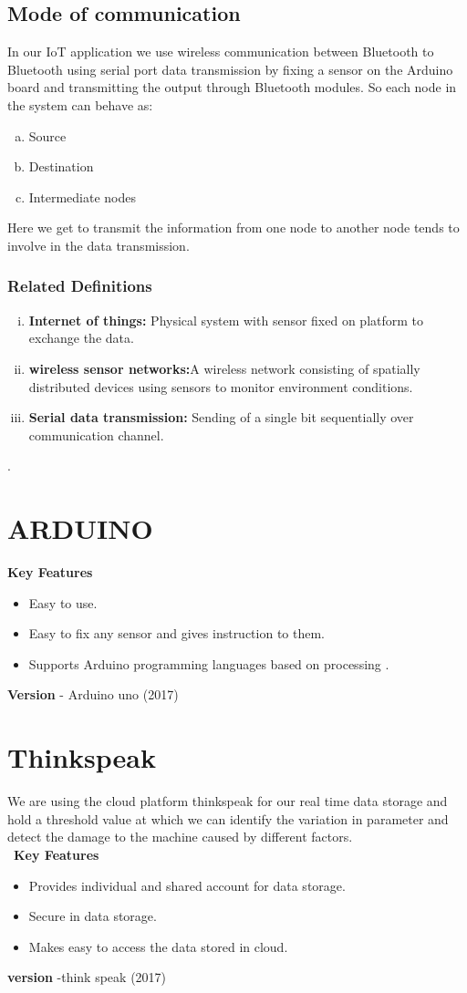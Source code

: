     
\subsection{ Mode of communication}
In our IoT application we use wireless communication between Bluetooth to Bluetooth using serial port data transmission by fixing a sensor on the Arduino board and transmitting the output through Bluetooth modules. 
So each node in the system can behave as:
\begin{enumerate}[(a)]
 \item Source
 \item Destination
 \item Intermediate nodes
\end{enumerate}
Here we get to transmit the information from one node to another node tends to involve in the data transmission.  

\subsubsection{Related Definitions}
\begin{enumerate}[(i)]
 \item {\bf Internet of things:} Physical system with sensor fixed on platform to exchange the data.
 \item {\bf wireless sensor networks:}A wireless network consisting of spatially distributed devices using sensors to monitor environment conditions.
 \item {\bf Serial data transmission:} Sending of a single bit sequentially over communication channel.
 
\end{enumerate}
.
\clearpage
\section{ARDUINO } 
{\bf Key Features}
\begin{itemize}
    \item Easy to use.
    \item Easy to fix any sensor and gives instruction to them.
    \item Supports Arduino programming languages based on processing .
\end{itemize}
{\bf Version} - Arduino uno (2017)
\section {Thinkspeak}
We are using the cloud platform thinkspeak for our real time data storage and hold a threshold value at which we can identify the variation in parameter and detect the damage to the machine caused by different factors.\\\
{\bf Key Features}
\begin{itemize}
    \item Provides individual and shared account for data storage.
    \item Secure in data storage.
    \item Makes easy to access the data stored in cloud.
\end{itemize}
{\bf version}  -think speak (2017)
